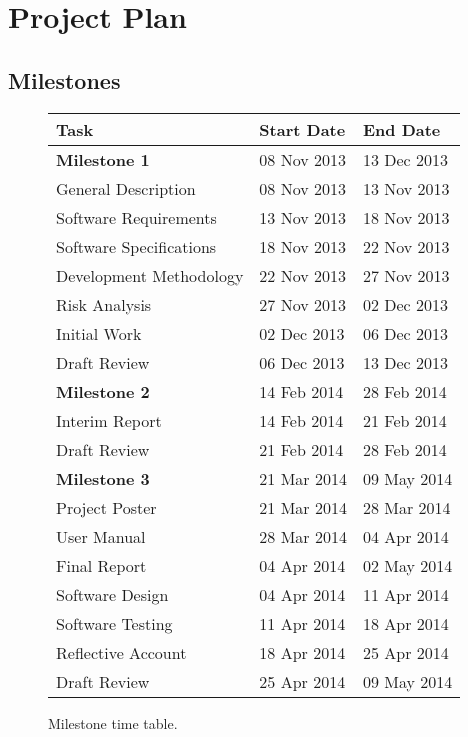 \documentclass[11pt,a4paper]{article}
\renewcommand{\arraystretch}{1.5}
\begin{document}
\section{Project Plan}
\label{sec:project-plan}

\subsection{Milestones}
\label{sec:plan-milestones}

\renewcommand{\arraystretch}{1.5}
\newcommand*{\tableIndent}{\hspace*{0.4cm}}

\begin{figure}[h!]
\centering
\begin{tabular}{|l|l|l|}
\hline \textbf{Task} & \textbf{Start Date} & \textbf{End Date} \\ 
\hline \hline \textbf{Milestone 1} & 08 Nov 2013 & 13 Dec 2013 \\ 
\hline\tableIndent General Description & 08 Nov 2013 & 13 Nov 2013 \\ 
\hline\tableIndent Software Requirements & 13 Nov 2013 & 18 Nov 2013 \\ 
\hline\tableIndent Software Specifications & 18 Nov 2013 & 22 Nov 2013 \\ 
\hline\tableIndent Development Methodology & 22 Nov 2013 & 27 Nov 2013 \\ 
\hline\tableIndent Risk Analysis & 27 Nov 2013 & 02 Dec 2013 \\ 
\hline\tableIndent Initial Work  & 02 Dec 2013 & 06 Dec 2013 \\ 
\hline\tableIndent Draft Review  & 06 Dec 2013 & 13 Dec 2013 \\ 
\hline\textbf{Milestone 2} & 14 Feb 2014 & 28 Feb 2014 \\ 
\hline\tableIndent Interim Report & 14 Feb 2014 & 21 Feb 2014 \\ 
\hline\tableIndent Draft Review & 21 Feb 2014 & 28 Feb 2014 \\
\hline\textbf{Milestone 3} & 21 Mar 2014 & 09 May 2014 \\ 
\hline\tableIndent Project Poster & 21 Mar 2014 & 28 Mar 2014 \\ 
\hline\tableIndent User Manual & 28 Mar 2014 & 04 Apr 2014 \\ 
\hline\tableIndent Final Report & 04 Apr 2014 & 02 May 2014 \\
\hline\tableIndent\tableIndent Software Design & 04 Apr 2014 & 11 Apr 2014 \\ 
\hline\tableIndent\tableIndent Software Testing & 11 Apr 2014 & 18 Apr 2014 \\ 
\hline\tableIndent\tableIndent Reflective Account & 18 Apr 2014 & 25 Apr 2014 \\
\hline\tableIndent\tableIndent Draft Review & 25 Apr 2014 & 09 May 2014 \\
\hline 
\end{tabular}

\caption{Milestone time table.\label{fig:milestones-table}}
\end{figure}
\end{document}
